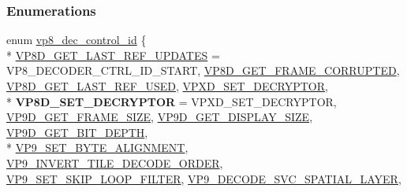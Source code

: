 \subsubsection*{Enumerations}
\begin{DoxyCompactItemize}
\item 
enum \hyperlink{group__vp8__decoder_gaf9dd3f2e6d1412106ee791af768e57c1}{vp8\+\_\+dec\+\_\+control\+\_\+id} \{ \\*
\hyperlink{group__vp8__decoder_ggaf9dd3f2e6d1412106ee791af768e57c1a0b6055c47120f28e3de959960ee0a02b}{V\+P8\+D\+\_\+\+G\+E\+T\+\_\+\+L\+A\+S\+T\+\_\+\+R\+E\+F\+\_\+\+U\+P\+D\+A\+T\+ES} = V\+P8\+\_\+\+D\+E\+C\+O\+D\+E\+R\+\_\+\+C\+T\+R\+L\+\_\+\+I\+D\+\_\+\+S\+T\+A\+RT, 
\hyperlink{group__vp8__decoder_ggaf9dd3f2e6d1412106ee791af768e57c1af9f82d9e7930e6a2244b30b031b79599}{V\+P8\+D\+\_\+\+G\+E\+T\+\_\+\+F\+R\+A\+M\+E\+\_\+\+C\+O\+R\+R\+U\+P\+T\+ED}, 
\hyperlink{group__vp8__decoder_ggaf9dd3f2e6d1412106ee791af768e57c1aa57d870ac8cf395fdc86da4a8939b10b}{V\+P8\+D\+\_\+\+G\+E\+T\+\_\+\+L\+A\+S\+T\+\_\+\+R\+E\+F\+\_\+\+U\+S\+ED}, 
\hyperlink{group__vp8__decoder_ggaf9dd3f2e6d1412106ee791af768e57c1a7fbdffa6018163d0ecf12b50276beba0}{V\+P\+X\+D\+\_\+\+S\+E\+T\+\_\+\+D\+E\+C\+R\+Y\+P\+T\+OR}, 
\\*
{\bfseries V\+P8\+D\+\_\+\+S\+E\+T\+\_\+\+D\+E\+C\+R\+Y\+P\+T\+OR} = V\+P\+X\+D\+\_\+\+S\+E\+T\+\_\+\+D\+E\+C\+R\+Y\+P\+T\+OR, 
\hyperlink{group__vp8__decoder_ggaf9dd3f2e6d1412106ee791af768e57c1a7a8d537472fc7561bd86c7395994ba37}{V\+P9\+D\+\_\+\+G\+E\+T\+\_\+\+F\+R\+A\+M\+E\+\_\+\+S\+I\+ZE}, 
\hyperlink{group__vp8__decoder_ggaf9dd3f2e6d1412106ee791af768e57c1aec6eaaa866488cfe1d0cb83cab302ebd}{V\+P9\+D\+\_\+\+G\+E\+T\+\_\+\+D\+I\+S\+P\+L\+A\+Y\+\_\+\+S\+I\+ZE}, 
\hyperlink{group__vp8__decoder_ggaf9dd3f2e6d1412106ee791af768e57c1a0c0d6174e3dd0ae615913d940a2bbdeb}{V\+P9\+D\+\_\+\+G\+E\+T\+\_\+\+B\+I\+T\+\_\+\+D\+E\+P\+TH}, 
\\*
\hyperlink{group__vp8__decoder_ggaf9dd3f2e6d1412106ee791af768e57c1a5a045a5e858c7641aea8987fed5e24b4}{V\+P9\+\_\+\+S\+E\+T\+\_\+\+B\+Y\+T\+E\+\_\+\+A\+L\+I\+G\+N\+M\+E\+NT}, 
\hyperlink{group__vp8__decoder_ggaf9dd3f2e6d1412106ee791af768e57c1a1c4fc468749a2ef88e148f09210ce73c}{V\+P9\+\_\+\+I\+N\+V\+E\+R\+T\+\_\+\+T\+I\+L\+E\+\_\+\+D\+E\+C\+O\+D\+E\+\_\+\+O\+R\+D\+ER}, 
\hyperlink{group__vp8__decoder_ggaf9dd3f2e6d1412106ee791af768e57c1a999ed127a9ddb4be322a5a93eaed1233}{V\+P9\+\_\+\+S\+E\+T\+\_\+\+S\+K\+I\+P\+\_\+\+L\+O\+O\+P\+\_\+\+F\+I\+L\+T\+ER}, 
\hyperlink{group__vp8__decoder_ggaf9dd3f2e6d1412106ee791af768e57c1ab1998be4a82605b6ce2a931210878916}{V\+P9\+\_\+\+D\+E\+C\+O\+D\+E\+\_\+\+S\+V\+C\+\_\+\+S\+P\+A\+T\+I\+A\+L\+\_\+\+L\+A\+Y\+ER}, 

\end{DoxyCompactItemize}

